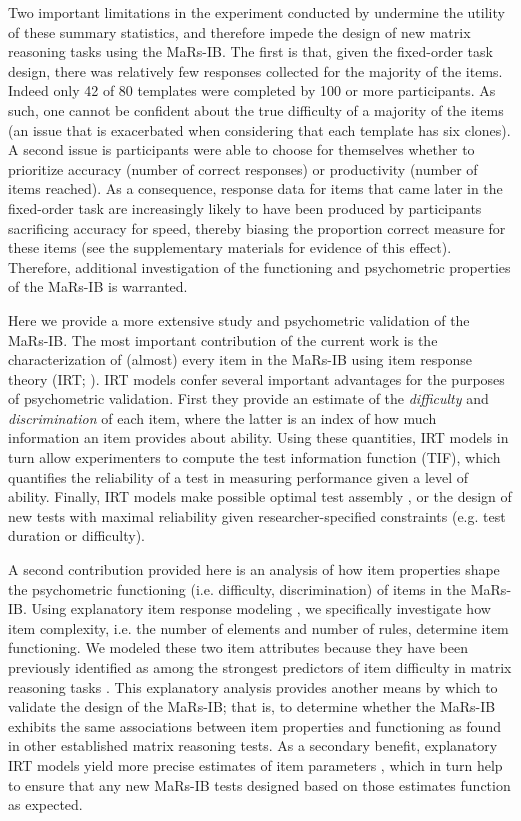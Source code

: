 \documentclass[a4paper,man,natbib]{apa6}
\begin{document}
Two important limitations in the experiment conducted by \cite{chierchia2019matrix} undermine the utility of these summary statistics, and therefore impede the design of new matrix reasoning tasks using the MaRs-IB. The first is that, given the fixed-order task design,  there was relatively few responses collected for the majority of the items. Indeed only 42 of 80 templates were completed by 100 or more participants. As such, one cannot be confident about the true difficulty of a majority of the items (an issue that is exacerbated when considering that each template has six clones). A second issue is participants were able to choose for themselves whether to prioritize accuracy (number of correct responses) or productivity (number of items reached). As a consequence, response data for items that came later in the fixed-order task are increasingly likely to have been produced by participants sacrificing accuracy for speed, thereby biasing the proportion correct measure for these items (see the supplementary materials for evidence of this effect). Therefore, additional investigation of the functioning and psychometric properties of the MaRs-IB is warranted.

Here we provide a more extensive study and psychometric validation of the MaRs-IB. The most important contribution of the current work is the characterization of (almost) every item in the MaRs-IB using item response theory (IRT; \citealt{embretson2013item, de2013theory}). IRT models confer several important advantages for the purposes of psychometric validation. First they provide an estimate of the \textit{difficulty} and \textit{discrimination} of each item, where the latter is an index of how much information an item provides about ability. Using these quantities, IRT models in turn allow experimenters to compute the test information function (TIF), which quantifies the reliability of a test in measuring performance given a level of ability. Finally, IRT models make possible optimal test assembly  \citep{van1998optimal}, or the design of new tests with maximal reliability given researcher-specified constraints (e.g. test duration or difficulty).

A second contribution provided here is an analysis of how item properties shape the psychometric functioning (i.e. difficulty, discrimination) of items in the MaRs-IB. Using explanatory item response modeling \citep{de2004explanatory, wilson2008explanatory}, we specifically investigate how item complexity, i.e. the number of elements and number of rules, determine item functioning. We modeled these two item attributes because they have been previously identified as among the strongest predictors of item difficulty in matrix reasoning tasks \citep{embretson1998cognitive, primi2001complexity}. This explanatory analysis provides another means by which to validate the design of the MaRs-IB; that is, to determine whether the MaRs-IB exhibits the same associations between item properties and functioning as found in other established matrix reasoning tests. As a secondary benefit, explanatory IRT models yield more precise estimates of item parameters \citep{neuhaus2006separating}, which in turn help to ensure that any new MaRs-IB tests designed based on those estimates function as expected.
\end{document}
